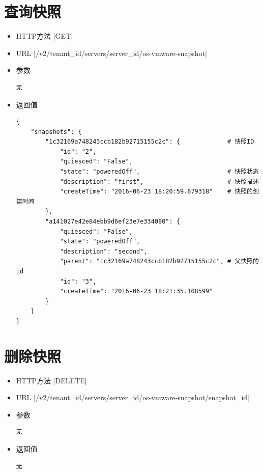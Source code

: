 \documentclass[oneside]{book}
\begin{document}
\section{查询快照}
\begin{itemize}
\item HTTP方法
|GET|
\item URL
|/v2/{tenant_id}/servers/{server_id}/os-vmware-snapshot|
\item 参数
\begin{verbatim}
无
\end{verbatim}
\item 返回值
\begin{verbatim}
{
    "snapshots": {
        "1c32169a748243ccb182b92715155c2c": {             # 快照ID
            "id": "2",
            "quiesced": "False",
            "state": "poweredOff",                        # 快照状态
            "description": "first",                       # 快照描述
            "createTime": "2016-06-23 18:20:59.679318"    # 快照的创建时间
        },
        "a141027e42e84ebb9d6ef23e7e334080": {
            "quiesced": "False",
            "state": "poweredOff",
            "description": "second",
            "parent": "1c32169a748243ccb182b92715155c2c", # 父快照的id
            "id": "3",
            "createTime": "2016-06-23 18:21:35.108599"
        }
    }
}
\end{verbatim}
\end{itemize}

\section{删除快照}
\begin{itemize}
\item HTTP方法
|DELETE|
\item URL
|/v2/{tenant_id}/servers/{server_id}/os-vmware-snapshot/{snapshot_id}|
\item 参数
\begin{verbatim}
无
\end{verbatim}
\item 返回值
\begin{verbatim}
无
\end{verbatim}
\end{itemize}
\end{document}
